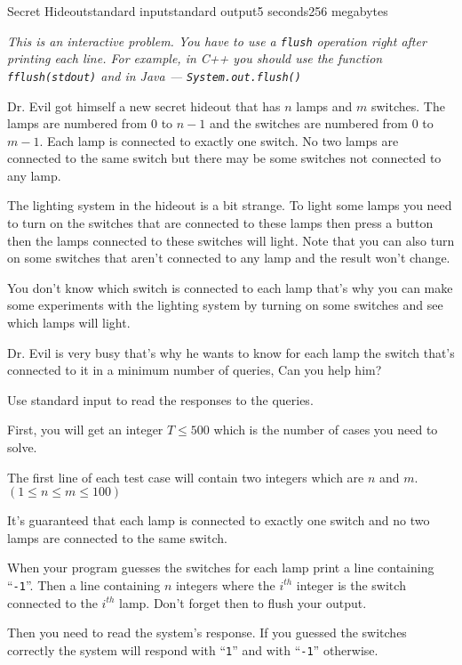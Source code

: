 \begin{problem}{Secret Hideout}{standard input}{standard output}{5 seconds}{256 megabytes}

\textit{This is an interactive problem. You have to use a \texttt{flush} operation right after printing each line. For example, in C++ you should use the function \texttt{fflush(stdout)} and in Java --- \texttt{System.out.flush()}}

Dr. Evil got himself a new secret hideout that has $n$ lamps and $m$ switches. The lamps are numbered from $0$ to $n-1$ and the switches are numbered from $0$ to $m-1$. Each lamp is connected to exactly one switch. No two lamps are connected to the same switch but there may be some switches not connected to any lamp.

The lighting system in the hideout is a bit strange. To light some lamps you need to turn on the switches that are connected to these lamps then press a button then the lamps connected to these switches will light. Note that you can also turn on some switches that aren't connected to any lamp and the result won't change.

You don't know which switch is connected to each lamp that's why you can make some experiments with the lighting system by turning on some switches and see which lamps will light. 

Dr. Evil is very busy that's why he wants to know for each lamp the switch that's connected to it in a minimum number of queries, Can you help him?

\InputFile
Use standard input to read the responses to the queries.

First, you will get an integer $T \le 500$ which is the number of cases you need to solve.

The first line of each test case will contain two integers which are $n$ and $m$. $(1 \le n \le m \le 100)$

It's guaranteed that each lamp is connected to exactly one switch and no two lamps are connected to the same switch.

\OutputFile
When your program guesses the switches for each lamp print a line containing ``\texttt{-1}''. Then a line containing $n$ integers where the $i^{th}$ integer is the switch connected to the $i^{th}$ lamp. Don't forget then to flush your output.

Then you need to read the system's response. If you guessed the switches correctly the system will respond with ``\texttt{1}'' and with ``\texttt{-1}'' otherwise.


\end{problem}

